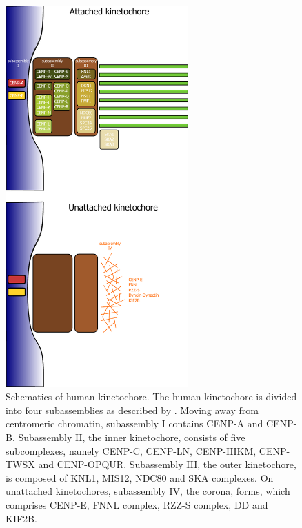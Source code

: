 \begin{figure}[htbp]
  \centering
  \includegraphics[width=0.625\textwidth]{chapter1/figures/kinetochore.pdf}
  \caption[Schematics of the human kinetochore]{Schematics of human kinetochore. The human kinetochore is divided into four subassemblies as described by \cite{McAinsh2022TheKinetochores}. Moving away from centromeric chromatin, subassembly I contains CENP-A and CENP-B. Subassembly II, the inner kinetochore, consists of five subcomplexes, namely CENP-C, CENP-LN, CENP-HIKM, CENP-TWSX and CENP-OPQUR. Subassembly III, the outer kinetochore, is composed of KNL1, MIS12, NDC80 and SKA complexes. On unattached kinetochores, subassembly IV, the corona, forms, which comprises CENP-E, FNNL complex, RZZ-S complex, DD and KIF2B. }
  \label{fig:KTSchematics}
\end{figure}

